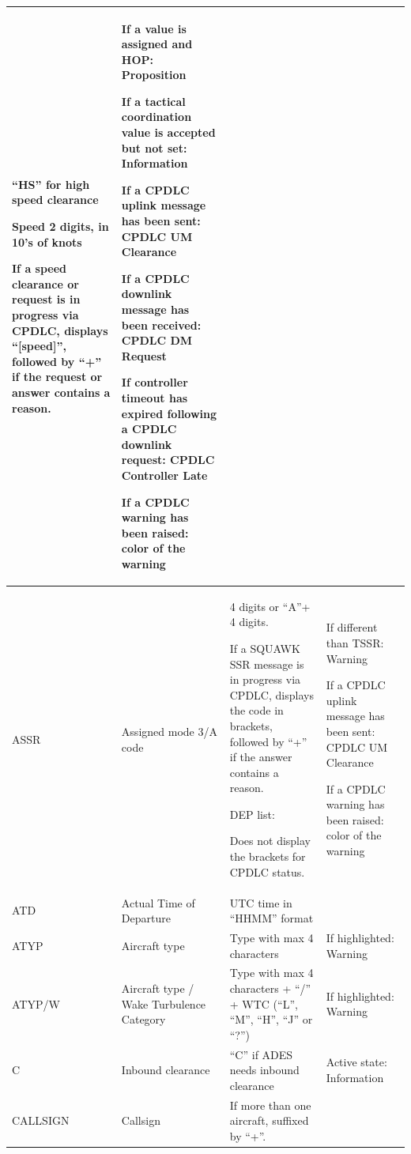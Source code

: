 \documentclass[11pt,a4paper,oldfontcommands]{memoir}
\begin{document}
\begin{longtable}{|p{2.5cm}|p{2.5cm}|p{4.5cm}|p{4.5cm}|}
      “HS” for high speed clearance 
      \bigskip

      Speed 2 digits, in 10’s of knots
      \bigskip
      
      If a speed clearance or request is in  progress via CPDLC, displays  “{[}speed{]}”, followed by “+” if the  request or answer contains a reason. &
      If a value is assigned and  HOP: Proposition 
      \smallskip

      If a tactical coordination  value is accepted but not  set: Information 
      \smallskip
      
      If a CPDLC uplink message  has been sent:  CPDLC UM Clearance 
      \smallskip
      
      If a CPDLC downlink  message has been  received:  CPDLC DM Request 
      \smallskip
      
      If controller timeout has expired following a CPDLC  downlink request:  CPDLC Controller Late 
      \smallskip
      
      If a CPDLC warning has  been raised: color of the  warning \\ \hline
    ASSR &
      Assigned mode 3/A code &
      4 digits or “A”+ 4 digits. 
      \bigskip

      If a SQUAWK SSR message is in  progress via CPDLC, displays the  code in brackets, followed by “+” if  the answer contains a reason. 
      \bigskip

      DEP list:
      
      Does not display the  brackets for CPDLC status. &
      If different than TSSR:  Warning 
      \smallskip

      If a CPDLC uplink message  has been sent:  CPDLC UM Clearance 
      \smallskip
      
      If a CPDLC warning has  been raised: color of the  warning \\ \hline
    ATD &
      Actual Time of Departure &
      UTC time in “HHMM” format &
       \\ \hline
    ATYP &
      Aircraft type &
      Type with max 4 characters &
      If highlighted: Warning \\ \hline
    ATYP/W &
      Aircraft type / Wake  Turbulence Category &
      Type with max 4 characters + “/” +  WTC (“L”, “M”, “H”, “J” or “?”) &
      If highlighted: Warning \\ \hline
    C &
      Inbound clearance &
      “C” if ADES needs inbound clearance &
      Active state: Information \\ \hline
    CALLSIGN &
      Callsign &
      If more than one aircraft, suffixed  by “+”. 
      \bigskip
      

\end{longtable}
\end{document}
